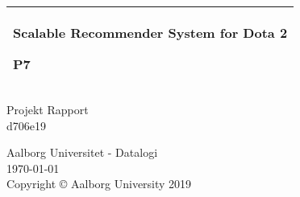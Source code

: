 %
%
%
%
%
\begin{titlepage}
  \addtolength{\hoffset}{0.5\evensidemargin-0.5\oddsidemargin} %
  \noindent%
  \begin{tabular}{@{}p{\textwidth}@{}}
    \toprule[2pt]
    \midrule
    \vspace{0.2cm}
    \begin{center}
    \Huge{\textbf{
      Scalable Recommender System for Dota 2
    }}
    \end{center}
    \begin{center}
      \Large{
        P7%
      }
    \end{center}
    \vspace{0.2cm}\\
    \midrule
    \toprule[2pt]
  \end{tabular}
  \vspace{4 cm}
  \begin{center}
    {\large
      Projekt Rapport%
    }\\
    \vspace{0.2cm}
    {\Large
      d706e19%
    }
  \end{center}
  \vfill
  \begin{center}
  Aalborg Universitet - Datalogi\\
  \today \\
  \noindent Copyright \copyright{} Aalborg University 2019\par
  \end{center}
\end{titlepage}
\cleardoublepage
